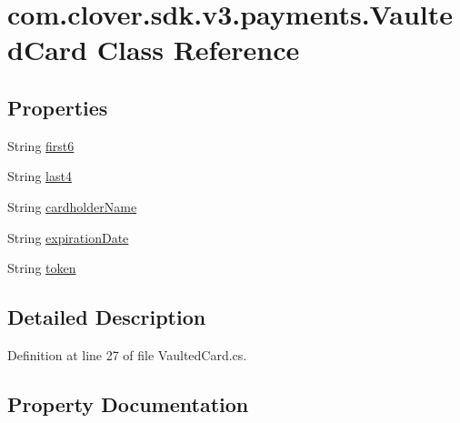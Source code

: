 \hypertarget{classcom_1_1clover_1_1sdk_1_1v3_1_1payments_1_1_vaulted_card}{}\section{com.\+clover.\+sdk.\+v3.\+payments.\+Vaulted\+Card Class Reference}
\label{classcom_1_1clover_1_1sdk_1_1v3_1_1payments_1_1_vaulted_card}
\subsection*{Properties}
\begin{DoxyCompactItemize}
\item 
String \hyperlink{classcom_1_1clover_1_1sdk_1_1v3_1_1payments_1_1_vaulted_card_a6cc61e7df7142a9fca26ce43cef4bf98}{first6}
\item 
String \hyperlink{classcom_1_1clover_1_1sdk_1_1v3_1_1payments_1_1_vaulted_card_a71a1ca96354484b0bf6340892e413e6c}{last4}
\item 
String \hyperlink{classcom_1_1clover_1_1sdk_1_1v3_1_1payments_1_1_vaulted_card_aec5ef8591ada1cdaed8de60479a714fd}{cardholder\+Name}
\item 
String \hyperlink{classcom_1_1clover_1_1sdk_1_1v3_1_1payments_1_1_vaulted_card_a53a50bef5ce2d4591c3d89a47003b135}{expiration\+Date}
\item 
String \hyperlink{classcom_1_1clover_1_1sdk_1_1v3_1_1payments_1_1_vaulted_card_a91c3f160d31fa26e2ac2d22c5ea3e6f1}{token}
\end{DoxyCompactItemize}


\subsection{Detailed Description}


Definition at line 27 of file Vaulted\+Card.\+cs.



\subsection{Property Documentation}
\mbox{\label{classcom_1_1clover_1_1sdk_1_1v3_1_1payments_1_1_vaulted_card_aec5ef8591ada1cdaed8de60479a714fd}} 
